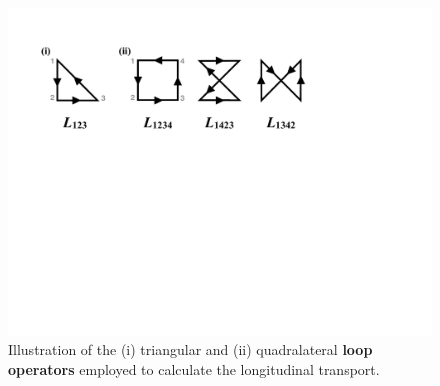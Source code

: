 \documentclass[amsmath,amssymb, aps, prx, longbibliography, twocolumn]{revtex4-1}
\begin{document}
\begin{figure}[b]
\includegraphics[scale=0.48]{LoopOperators.pdf}
\caption{
 Illustration of the (i) triangular and (ii) quadralateral {\bf loop operators} employed to calculate the longitudinal transport. 
}\label{fig:loops}
\end{figure}
\end{document}
